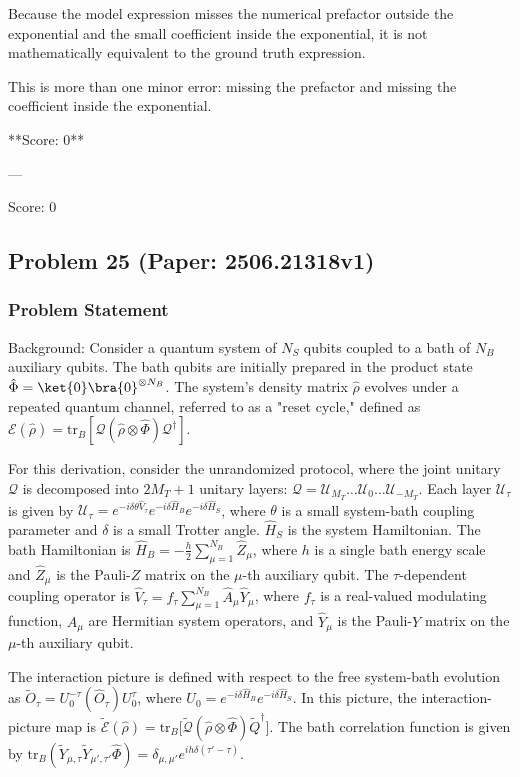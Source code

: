 \documentclass[10pt]{article}
\begin{document}
Because the model expression misses the numerical prefactor outside the exponential and the small coefficient inside the exponential, it is not mathematically equivalent to the ground truth expression.

This is more than one minor error: missing the prefactor and missing the coefficient inside the exponential.

**Score: 0**

---

Score: 0

\newpage
\subsection*{Problem 25 (Paper: 2506.21318v1)}
\subsubsection*{Problem Statement}
Background:
Consider a quantum system of $N_S$ qubits coupled to a bath of $N_B$ auxiliary qubits. The bath qubits are initially prepared in the product state $\hat\Phi = \ket{0}\bra{0}^{\otimes N_B}$. The system's density matrix $\hat\rho$ evolves under a repeated quantum channel, referred to as a "reset cycle," defined as $\mathcal{E}(\hat\rho) = \text{tr}_B [\mathcal{Q}(\hat\rho\otimes\hat\Phi)\mathcal{Q}^\dagger]$.

For this derivation, consider the unrandomized protocol, where the joint unitary $\mathcal{Q}$ is decomposed into $2M_T+1$ unitary layers: $\mathcal{Q} = \mathcal{U}_{M_T}\ldots \mathcal{U}_{0}\ldots \mathcal{U}_{-M_T}$. Each layer $\mathcal{U}_\tau$ is given by $\mathcal{U_\tau} = e^{-i\delta\theta \hat V_{\tau}}e^{-i\delta\hat H_B}e^{-i\delta \hat H_S}$, where $\theta$ is a small system-bath coupling parameter and $\delta$ is a small Trotter angle. $\hat H_S$ is the system Hamiltonian. The bath Hamiltonian is $\hat H_B = -\frac{h}{2}\sum_{\mu=1}^{N_B} \hat Z_\mu$, where $h$ is a single bath energy scale and $\hat Z_\mu$ is the Pauli-$Z$ matrix on the $\mu$-th auxiliary qubit. The $\tau$-dependent coupling operator is $\hat V_{\tau} = f_\tau\sum_{\mu = 1}^{N_B} \hat A_\mu \hat Y_\mu$, where $f_\tau$ is a real-valued modulating function, $\hat A_\mu$ are Hermitian system operators, and $\hat Y_\mu$ is the Pauli-$Y$ matrix on the $\mu$-th auxiliary qubit.

The interaction picture is defined with respect to the free system-bath evolution as $\tilde{O}_\tau = U_0^{-\tau} (\hat O_\tau)U_0^\tau$, where $U_0 = e^{-i\delta\hat H_B}e^{-i\delta \hat H_S}$. In this picture, the interaction-picture map is $\tilde{\mathcal{E}}(\hat \rho) = \text{tr}_B\big[ \tilde{\mathcal{Q}}(\hat\rho\otimes \hat\Phi)\tilde{Q}^{\dagger}\big]$. The bath correlation function is given by $\text{tr}_B( \tilde Y_{\mu,\tau}\tilde Y_{\mu',\tau'} \hat\Phi) = \delta_{\mu,\mu'}e^{ih\delta(\tau'-\tau)}$.
\end{document}
